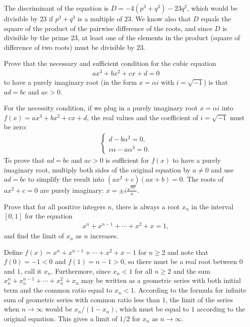 \documentclass[12pt,a4paper]{memoir}
\theoremstyle{definition}
\begin{document}
\begin{solution}
	The discriminant of the equation is $D=-4(p^3+q^3)-23q^2$, which would be divisible by $23$ if $p^3+q^3$ is a multiple of $23$. We know also that $D$ equals the square of the product of the pairwise difference of the roots, and since $D$ is divisible by the prime $23$, at least one of the elements in the product (square of difference of two roots) must be divisible by $23$.
\end{solution}


\begin{question}
	Prove that the necessary and sufficient condition for the cubic equation
	\begin{align*}
		ax^3+bx^2+cx+d=0
	\end{align*}
	to have a purely imaginary root (in the form $x=\alpha i$ with $i=\sqrt{-1}$) is that $ad=bc$ and $ac>0$.
\end{question}

\begin{solution}
	For the necessity condition, if we plug in a purely imaginary root $x=\alpha i$ into $f(x)=ax^3+bx^2+cx+d$, the real values and the coefficient of $i=\sqrt{-1}$ must be zero:
	\begin{align*}
		\begin{cases}
			d-b\alpha^2=0,\\ c\alpha-a\alpha^3=0.
		\end{cases}
	\end{align*}
	To prove that $ad=bc$ and $ac>0$ is sufficient for $f(x)$ to have a purely imaginary root, multiply both sides of the original equation by $a\neq 0$ and use $ad=bc$ to simplify the result into $(ax^2+c)(ax+b)=0$. The roots of $ax^2+c=0$ are purely imaginary: $x=\pm i\frac{\sqrt{ac}}{a}$. 
\end{solution}

\begin{question}
	Prove that for all positive integers $n$, there is always a root $x_n$ in the interval $[0,1]$ for the equation
	\begin{align*}
		x^{n} + x^{n-1} + \cdots + x^2 + x = 1,
	\end{align*}
	and find the limit of $x_n$ as $n$ increases.
\end{question}

\begin{solution}
	Define $f(x) = x^{n} + x^{n-1} + \cdots + x^2 + x - 1$ for $n\geq 2$ and note that $f(0)=-1<0$ and $f(1)=n-1>0$, so there must be a real root between $0$ and $1$, call it $x_n$. Furthermore, since $x_n<1$ for all $n\geq 2$ and the sum $x_n^{n} + x_n^{n-1} + \cdots + x_n^2 + x_n$ may be written as a geometric series with both initial term and the common ratio equal to $x_n<1$. According to the formula for infinite sum of geometric series with common ratio less than $1$, the limit of the series when $n\to \infty$ would be $x_n/(1-x_n)$, which must be equal to $1$ according to the original equation. This gives a limit of $1/2$ for $x_n$ as $n\to\infty$.
\end{solution}
\end{document}
